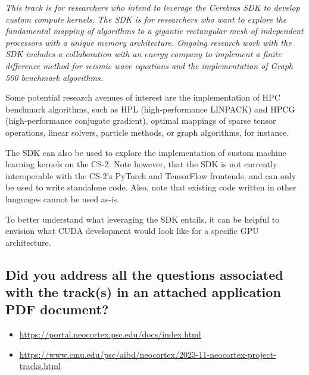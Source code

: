 \begin{displayquote} \itshape
This track is for researchers who intend to leverage the Cerebras SDK to develop custom compute kernels.
The SDK is for researchers who want to explore the fundamental mapping of algorithms to a gigantic rectangular mesh of independent processors with a unique memory architecture.
Ongoing research work with the SDK includes a collaboration with an energy company to implement a finite difference method for seismic wave equations and the implementation of Graph 500 benchmark algorithms.

Some potential research avenues of interest are the implementation of HPC benchmark algorithms, such as HPL (high-performance LINPACK) and HPCG (high-performance conjugate gradient), optimal mappings of sparse tensor operations, linear solvers, particle methods, or graph algorithms, for instance.

The SDK can also be used to explore the implementation of custom machine learning kernels on the CS-2.
Note however, that the SDK is not currently interoperable with the CS-2's PyTorch and TensorFlow frontends, and can only be used to write standalone code.
Also, note that existing code written in other languages cannot be used as-is.

To better understand what leveraging the SDK entails, it can be helpful to envision what CUDA development would look like for a specific GPU architecture.
\end{displayquote}

\subsection{Did you address all the questions associated with the track(s) in an attached application PDF document?}

\begin{displayquote} \itshape
    \begin{itemize}
    \item \url{https://portal.neocortex.psc.edu/docs/index.html}
    \item \url{https://www.cmu.edu/psc/aibd/neocortex/2023-11-neocortex-project-tracks.html}
    \end{itemize}
\end{displayquote}

